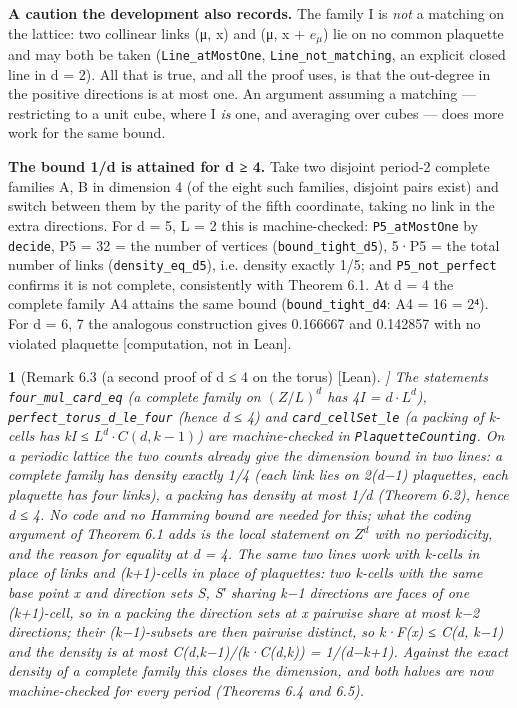 \documentclass[11pt,a4paper]{article}
\theoremstyle{named}
\newtheorem*{namedthm}{}
\begin{document}
\textbf{A caution the development also records.} The family I is \textit{not} a matching on the lattice: two collinear links (μ, x) and (μ, x + $e_{μ}$) lie on no common plaquette and may both be taken (\texttt{Line\_\allowbreak{}atMostOne}, \texttt{Line\_\allowbreak{}not\_\allowbreak{}matching}, an explicit closed line in d = 2). All that is true, and all the proof uses, is that the out-degree in the positive directions is at most one. An argument assuming a matching — restricting to a unit cube, where I \textit{is} one, and averaging over cubes — does more work for the same bound.

\textbf{The bound 1/d is attained for d ≥ 4.} Take two disjoint period-2 complete families A, B in dimension 4 (of the eight such families, disjoint pairs exist) and switch between them by the parity of the fifth coordinate, taking no link in the extra directions. For d = 5, L = 2 this is machine-checked: \texttt{P5\_\allowbreak{}atMostOne} by \texttt{decide}, \textbar{}P5\textbar{} = 32 = the number of vertices (\texttt{bound\_\allowbreak{}tight\_\allowbreak{}d5}), 5·\textbar{}P5\textbar{} = the total number of links (\texttt{density\_\allowbreak{}eq\_\allowbreak{}d5}), i.e. density exactly 1/5; and \texttt{P5\_\allowbreak{}not\_\allowbreak{}perfect} confirms it is not complete, consistently with Theorem 6.1. At d = 4 the complete family A4 attains the same bound (\texttt{bound\_\allowbreak{}tight\_\allowbreak{}d4}: \textbar{}A4\textbar{} = 16 = 2⁴). For d = 6, 7 the analogous construction gives 0.166667 and 0.142857 with no violated plaquette [computation, not in Lean].

\begin{namedthm}[Remark 6.3 (a second proof of d ≤ 4 on the torus) [Lean]]
The statements \texttt{four\_\allowbreak{}mul\_\allowbreak{}card\_\allowbreak{}eq} (a complete family on $(Z/L)^d$ has 4\textbar{}I\textbar{} = $d·L^d$), \texttt{perfect\_\allowbreak{}torus\_\allowbreak{}d\_\allowbreak{}le\_\allowbreak{}four} (hence d ≤ 4) and \texttt{card\_\allowbreak{}cellSet\_\allowbreak{}le} (a packing of k-cells has k\textbar{}I\textbar{} ≤ $L^d·C(d,k−1)$) are machine-checked in \texttt{PlaquetteCounting}. On a periodic lattice the two counts already give the dimension bound in two lines: a complete family has density exactly 1/4 (each link lies on 2(d−1) plaquettes, each plaquette has four links), a packing has density at most 1/d (Theorem 6.2), hence d ≤ 4. No code and no Hamming bound are needed for this; what the coding argument of Theorem 6.1 adds is the local statement on $Z^d$ with no periodicity, and the reason for equality at d = 4. The same two lines work with k-cells in place of links and (k+1)-cells in place of plaquettes: two k-cells with the same base point x and direction sets S, S′ sharing k−1 directions are faces of one (k+1)-cell, so in a packing the direction sets at x pairwise share at most k−2 directions; their (k−1)-subsets are then pairwise distinct, so k·\textbar{}F(x)\textbar{} ≤ C(d, k−1) and the density is at most C(d,k−1)/(k·C(d,k)) = 1/(d−k+1). Against the exact density of a complete family this closes the dimension, and both halves are now machine-checked for every period (Theorems 6.4 and 6.5).
\end{namedthm}
\end{document}
